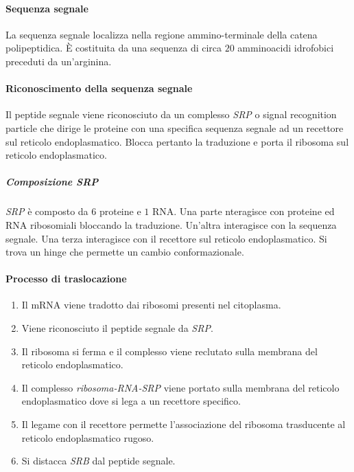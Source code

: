 			\paragraph{Sequenza segnale}
			La sequenza segnale localizza nella regione ammino-terminale della catena polipeptidica.
			\`E costituita da una sequenza di circa $20$ amminoacidi idrofobici preceduti da un'arginina.
			
			\paragraph{Riconoscimento della sequenza segnale}
			Il peptide segnale viene riconosciuto da un complesso \emph{SRP} o signal recognition particle che dirige le proteine con una specifica sequenza segnale ad un recettore sul reticolo endoplasmatico.
			Blocca pertanto la traduzione e porta il ribosoma sul reticolo endoplasmatico.

				\subparagraph{Composizione \emph{SRP}}
				\emph{SRP} \`e composto da $6$ proteine e $1$ RNA.
				Una parte nteragisce con proteine ed RNA ribosomiali bloccando la traduzione.
				Un'altra interagisce con la sequenza segnale.
				Una terza interagisce con il recettore sul reticolo endoplasmatico.
				Si trova un hinge che permette un cambio conformazionale.

			\paragraph{Processo di traslocazione}
			\begin{multicols}{2}
				\begin{enumerate}
					\item Il mRNA viene tradotto dai ribosomi presenti nel citoplasma.
					\item Viene riconosciuto il peptide segnale da \emph{SRP}.
					\item Il ribosoma si ferma e il complesso viene reclutato sulla membrana del reticolo endoplasmatico.
					\item Il complesso \emph{ribosoma-RNA-SRP} viene portato sulla membrana del reticolo endoplasmatico dove si lega a un recettore specifico.
					\item Il legame con il recettore permette l'associazione del ribosoma trasducente al reticolo endoplasmatico rugoso.
					\item Si distacca \emph{SRB} dal peptide segnale.
				\end{enumerate}
			\end{multicols}

